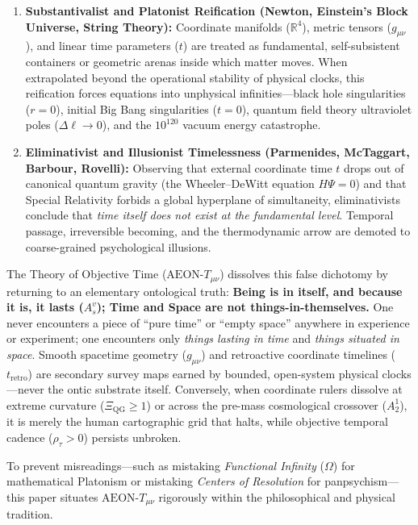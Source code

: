 \documentclass[
]{article}
\providecommand{\tightlist}{%
  \setlength{\itemsep}{0pt}\setlength{\parskip}{0pt}}
\begin{document}
\begin{enumerate}
\def\labelenumi{\arabic{enumi}.}
\tightlist
\item
  \textbf{Substantivalist and Platonist Reification (Newton, Einstein's
  Block Universe, String Theory):} Coordinate manifolds
  (\(\mathbb{R}^4\)), metric tensors (\(g_{\mu\nu}\)), and linear time
  parameters (\(t\)) are treated as fundamental, self-subsistent
  containers or geometric arenas inside which matter moves. When
  extrapolated beyond the operational stability of physical clocks, this
  reification forces equations into unphysical infinities---black hole
  singularities (\(r = 0\)), initial Big Bang singularities (\(t = 0\)),
  quantum field theory ultraviolet poles (\(\Delta\ell \to 0\)), and the
  \(10^{120}\) vacuum energy catastrophe.
\item
  \textbf{Eliminativist and Illusionist Timelessness (Parmenides,
  McTaggart, Barbour, Rovelli):} Observing that external coordinate time
  \(t\) drops out of canonical quantum gravity (the Wheeler--DeWitt
  equation \(H\Psi = 0\)) and that Special Relativity forbids a global
  hyperplane of simultaneity, eliminativists conclude that \emph{time
  itself does not exist at the fundamental level}. Temporal passage,
  irreversible becoming, and the thermodynamic arrow are demoted to
  coarse-grained psychological illusions.
\end{enumerate}

The Theory of Objective Time (\(\text{AEON-}T_{\mu\nu}\)) dissolves this
false dichotomy by returning to an elementary ontological truth:
\textbf{Being is in itself, and because it is, it lasts (\(A_s^v\));
Time and Space are not things-in-themselves.} One never encounters a
piece of ``pure time'' or ``empty space'' anywhere in experience or
experiment; one encounters only \emph{things lasting in time} and
\emph{things situated in space}. Smooth spacetime geometry
(\(g_{\mu\nu}\)) and retroactive coordinate timelines
(\(t_{\mathrm{retro}}\)) are secondary survey maps earned by bounded,
open-system physical clocks---never the ontic substrate itself.
Conversely, when coordinate rulers dissolve at extreme curvature
(\(\Xi_{\mathrm{QG}} \ge 1\)) or across the pre-mass cosmological
crossover (\(A_2^1\)), it is merely the human cartographic grid that
halts, while objective temporal cadence (\(\rho_\tau > 0\)) persists
unbroken.

To prevent misreadings---such as mistaking \emph{Functional Infinity}
(\(\Omega\)) for mathematical Platonism or mistaking \emph{Centers of
Resolution} for panpsychism---this paper situates
\(\text{AEON-}T_{\mu\nu}\) rigorously within the philosophical and
physical tradition.
\end{document}
